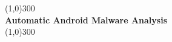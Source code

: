 \documentclass[../main.tex]{subfile}
\begin{document}
\begin{titlepage}
	\begin{center}
		\line(1,0){300}\\
		\huge{\bfseries Automatic Android Malware Analysis}\\
		\line(1,0){300}\\
	\end{center}
\end{titlepage}
\end{document}
